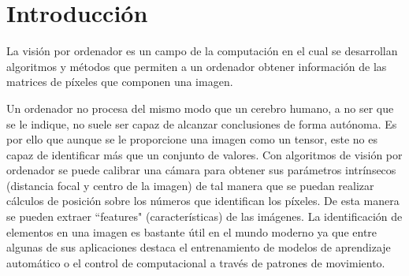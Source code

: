 \documentclass[a4paper,12pt]{article}
\newcommand{\vacio}{\textcolor{white}{ .}}
\begin{document}
{%

\renewcommand{\headrulewidth}{0.5pt}
\fancyhead[L]{\vacio}

\pagestyle{fancy}
\renewcommand{\footrulewidth}{0.5pt}
\fancyfoot[C]{\vacio}

\newpage

\tableofcontents

\newpage


\newpage


\section{Introducción}


\vspace{1cm}

La visión por ordenador es un campo de la computación en el cual se desarrollan algoritmos y métodos que permiten a un ordenador obtener información de las matrices de píxeles que componen una imagen.

\vspace{0.5cm}

Un ordenador no procesa del mismo modo que un cerebro humano, a no ser que se le indique, no suele ser capaz de alcanzar conclusiones de forma autónoma. Es por ello que aunque se le proporcione una imagen como un tensor, este no es capaz de identificar más que un conjunto de valores. Con algoritmos de visión por ordenador se puede calibrar una cámara para obtener sus parámetros intrínsecos (distancia focal y centro de la imagen) de tal manera que se puedan realizar cálculos de posición sobre los números que identifican los píxeles. De esta manera se pueden extraer ``features" (características) de las imágenes. La identificación de elementos en una imagen es bastante útil en el mundo moderno ya que entre algunas de sus aplicaciones destaca el entrenamiento de modelos de aprendizaje automático o el control de computacional a través de patrones de movimiento.

}
\end{document}
